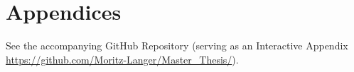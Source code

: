 \documentclass{report}
\begin{document}
\pagebreak
\printbibliography[
title=References
]
\clearpage %
\section*{Appendices}
See the accompanying GitHub Repository (serving as an Interactive Appendix \url{https://github.com/Moritz-Langer/Master_Thesis/}).
\end{document}
